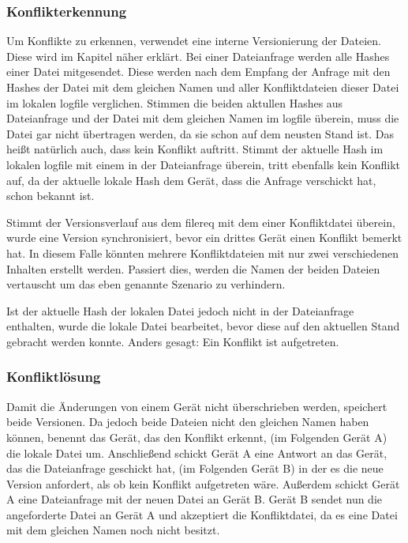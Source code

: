 \subsubsection{Konflikterkennung}\label{Konflikterkennung}
Um Konflikte zu erkennen, verwendet \sblit eine interne Versionierung der Dateien. Diese wird im Kapitel  näher erklärt. Bei einer Dateianfrage  werden alle Hashes einer Datei mitgesendet. Diese werden nach dem Empfang der Anfrage mit den Hashes der Datei mit dem gleichen Namen und aller Konfliktdateien dieser Datei im lokalen \gls{logfile} verglichen. Stimmen die beiden aktullen Hashes aus Dateianfrage und der Datei mit dem gleichen Namen im \gls{logfile} überein, muss die Datei gar nicht übertragen werden, da sie schon auf dem neusten Stand ist. Das heißt natürlich auch, dass kein Konflikt auftritt. Stimmt der aktuelle Hash im lokalen \gls{logfile} mit einem in der Dateianfrage überein, tritt ebenfalls kein Konflikt auf, da der aktuelle lokale Hash dem Gerät, dass die Anfrage verschickt hat, schon bekannt ist. 

Stimmt der Versionsverlauf aus dem \gls{filereq} mit dem einer Konfliktdatei überein, wurde eine Version synchronisiert, bevor ein drittes Gerät einen Konflikt bemerkt hat. In diesem Falle könnten mehrere Konfliktdateien mit nur zwei verschiedenen Inhalten erstellt werden. Passiert dies, werden die Namen der beiden Dateien vertauscht um das eben genannte Szenario zu verhindern.

Ist der aktuelle Hash der lokalen Datei jedoch nicht in der Dateianfrage enthalten, wurde die lokale Datei bearbeitet, bevor diese auf den aktuellen Stand gebracht werden konnte. Anders gesagt: Ein Konflikt ist aufgetreten.

\subsubsection{Konfliktlösung}
Damit die Änderungen von einem Gerät nicht überschrieben werden, speichert \sblit beide Versionen. Da jedoch beide Dateien nicht den gleichen Namen haben können, benennt das Gerät, das den Konflikt erkennt, (im Folgenden Gerät A) die lokale Datei um. Anschließend schickt Gerät A eine Antwort an das Gerät, das die Dateianfrage geschickt hat,  (im Folgenden Gerät B) in der es die neue Version anfordert, als ob kein Konflikt aufgetreten wäre. Außerdem schickt Gerät A eine Dateianfrage mit der neuen Datei an Gerät B. Gerät B sendet nun die angeforderte Datei an Gerät A und akzeptiert die Konfliktdatei, da es eine Datei mit dem gleichen Namen noch nicht besitzt. 

